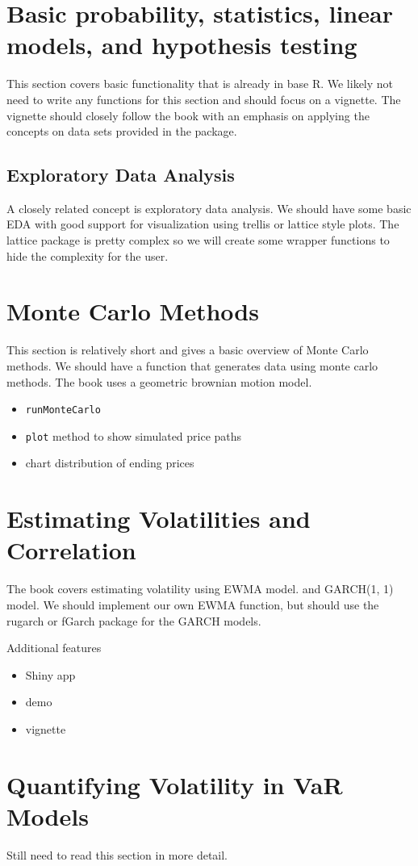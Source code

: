 \documentclass[12pt]{amsart}
\begin{document}
\section{Basic probability, statistics, linear models, and hypothesis testing}
This section covers basic functionality that is already in base R. We likely not need to write any functions for this section and should focus on a vignette. The vignette should closely follow the book with an emphasis on applying the concepts on data sets provided in the package.

\subsection{Exploratory Data Analysis}
A closely related concept is exploratory data analysis. We should have some basic EDA with good support for visualization using trellis or lattice style plots. The lattice package is pretty complex so we will create some wrapper functions to hide the complexity for the user.

\section{Monte Carlo Methods}
This section is relatively short and gives a basic overview of Monte Carlo methods. We should have a function that generates data using monte carlo methods. The book uses a geometric brownian motion model.

\begin{itemize}
\item \verb"runMonteCarlo"
\item \verb"plot" method to show simulated price paths
\item chart distribution of ending prices
\end{itemize}


\section{Estimating Volatilities and Correlation}
The book covers estimating volatility using EWMA model. and GARCH(1, 1) model. We should implement our own EWMA function, but should use the rugarch or fGarch package for the GARCH models.

Additional features
\begin{itemize}
\item Shiny app
\item demo
\item vignette
\end{itemize}

\section{Quantifying Volatility in VaR Models}
Still need to read this section in more detail.
\end{document}
